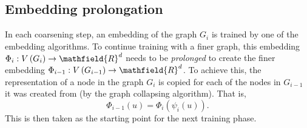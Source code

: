 \subsection{Embedding prolongation}
In each coarsening step, an embedding of the graph \( G_i \) is trained by one of the embedding algorithms. To continue training with a finer graph, this embedding \( \Phi_i: V \left( G_i \right) \to \mathfield{R}^d \) needs to be \textit{prolonged} to create the finer embedding \( \Phi_{i - 1}: V \left( G_{i - 1} \right) \to \mathfield{R}^d \). To achieve this, the representation of a node in the graph \( G_i \) is copied for each of the nodes in \( G_{i - 1} \) it was created from (by the graph collapsing algorithm). That is,
\[ \Phi_{i - 1} \left( u \right) = \Phi_i \left( \psi_i \left( u \right) \right)\text{.} \]
This is then taken as the starting point for the next training phase.
